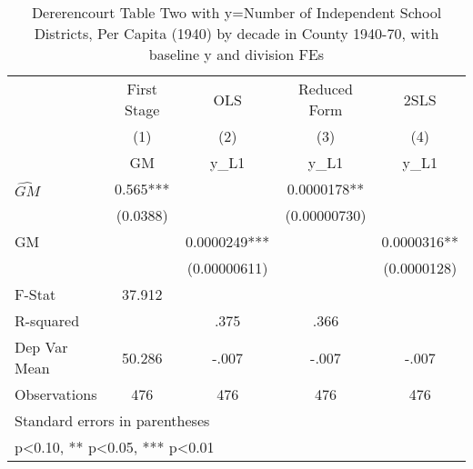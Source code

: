 \begin{table}[htbp]\centering
\def\sym#1{\ifmmode^{#1}\else\(^{#1}\)\fi}
\caption{Dererencourt Table Two with y=Number of Independent School Districts, Per Capita (1940) by decade in County 1940-70, with baseline y and division FEs}
\begin{tabular}{l*{4}{c}}
\toprule
                    & First Stage   &         OLS   &Reduced Form   &        2SLS   \\
                    &\multicolumn{1}{c}{(1)}&\multicolumn{1}{c}{(2)}&\multicolumn{1}{c}{(3)}&\multicolumn{1}{c}{(4)}\\
                    &\multicolumn{1}{c}{GM}&\multicolumn{1}{c}{y\_L1}&\multicolumn{1}{c}{y\_L1}&\multicolumn{1}{c}{y\_L1}\\
\midrule
$\hat{GM}$          &       0.565***&               &   0.0000178** &               \\
                    &    (0.0388)   &               &(0.00000730)   &               \\
\addlinespace
GM                  &               &   0.0000249***&               &   0.0000316** \\
                    &               &(0.00000611)   &               & (0.0000128)   \\
\midrule
F-Stat              &      37.912   &               &               &               \\
R-squared           &               &        .375   &        .366   &               \\
Dep Var Mean        &      50.286   &       -.007   &       -.007   &       -.007   \\
Observations        &         476   &         476   &         476   &         476   \\
\bottomrule
\multicolumn{5}{l}{\footnotesize Standard errors in parentheses}\\
\multicolumn{5}{l}{\footnotesize * p<0.10, ** p<0.05, *** p<0.01}\\
\end{tabular}
\end{table}
